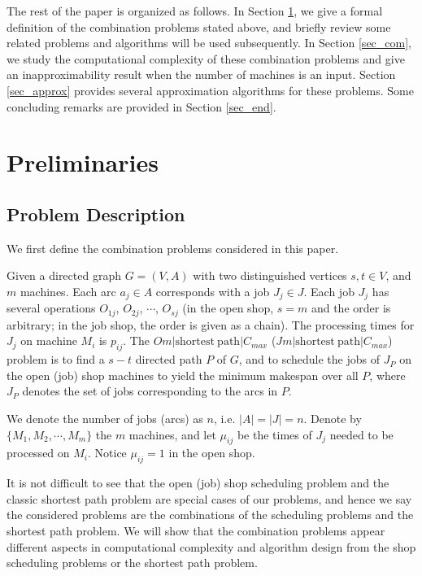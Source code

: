\documentclass{llncs}
\numberwithin{subcase}{case}
\begin{document}
The rest of the paper is organized as follows. In Section \ref{sec_pre}, we give a formal definition of the combination problems stated above, and briefly review some related problems and algorithms will be used subsequently. In Section \ref{sec_com}, we study the computational complexity of these combination problems and give an inapproximability result when the number of machines is an input. Section \ref{sec_approx} provides several approximation algorithms for these problems. Some concluding remarks are provided in Section \ref{sec_end}.

\section{Preliminaries}\label{sec_pre}
\subsection{Problem Description}\label{sec_pd}
We first define the combination problems considered in this paper.

\begin{definition}
Given a directed graph $G = (V, A)$ with two distinguished vertices $s, t \in V$, and $m$ machines. Each arc $a_j \in A$ corresponds with a job $J_j\in J$. Each job $J_j$ has several operations $O_{1j}$, $O_{2j}$, $\cdots$, $O_{sj}$ (in the open shop, $s = m$ and the order is arbitrary; in the job shop, the order is given as a chain). The processing times for $J_j$ on machine $M_i$ is $p_{ij}$. The $Om|\mathrm{shortest}~\mathrm{path}|C_{max}$ ($Jm|\mathrm{shortest}~\mathrm{path}|C_{max}$) problem is to find a $s-t$ directed path $P$ of $G$, and to schedule the jobs of $J_P$ on the open (job) shop machines to yield the minimum makespan over all $P$, where $J_P$ denotes the set of jobs corresponding to the arcs in $P$.\label{d_comb}
\end{definition}

We denote the number of jobs (arcs) as $n$, i.e. $|A| = |J| = n$. Denote by $\{M_1,M_2,\cdots, M_m\}$ the $m$ machines, and let $\mu_{ij}$ be the times of $J_j$ needed to be processed on $M_i$. Notice $\mu_{ij} = 1$ in the open shop.

It is not difficult to see that the open (job) shop scheduling problem and the classic shortest path problem are special cases of our problems, and hence we say the considered problems are the combinations of the scheduling problems and the shortest path problem. We will show that the combination problems appear different aspects in computational complexity and algorithm design from the shop scheduling problems or the shortest path problem.
\end{document}
